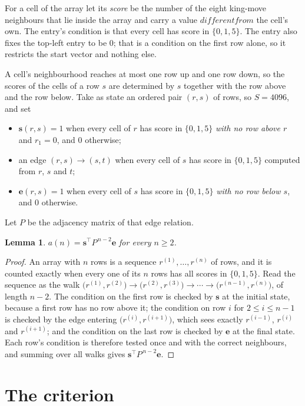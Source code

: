\documentclass[11pt,a4paper]{article}
\theoremstyle{plain}
\newtheorem{lemma}[theorem]{Lemma}
\theoremstyle{definition}
\begin{document}
For a cell of the array let its \emph{score} be the number of the eight king-move neighbours that lie inside
the array and carry a value $different from$ the cell's own. The entry's condition is that every cell
has score in $\{0,1,5\}$. The entry also fixes the top-left entry to be $0$; that is a condition on the first row alone, so it restricts the start vector and nothing else.

A cell's neighbourhood reaches at most one row up and one row down, so the scores of the
cells of a row $s$ are determined by $s$ together with the row above and the row below.
Take as state an ordered pair $(r,s)$ of rows, so $S=4096$, and set
\begin{itemize}
\item $\mathbf{s}(r,s)=1$ when every cell of $r$ has score in $\{0,1,5\}$ \emph{with no row
above $r$} and $r_1=0$, and $0$ otherwise;
\item an edge $(r,s)\to(s,t)$ when every cell of $s$ has score in $\{0,1,5\}$ computed from
$r$, $s$ and $t$;
\item $\mathbf{e}(r,s)=1$ when every cell of $s$ has score in $\{0,1,5\}$ \emph{with no row
below $s$}, and $0$ otherwise.
\end{itemize}
Let $P$ be the adjacency matrix of that edge relation.

\begin{lemma}\label{lem:walk}
$a(n)=\mathbf{s}^{\!\top}P^{\,n-2}\mathbf{e}$ for every $n\ge2$.
\end{lemma}

\begin{proof}
An array with $n$ rows is a sequence $r^{(1)},\dots,r^{(n)}$ of rows, and it is counted
exactly when every one of its $n$ rows has all scores in $\{0,1,5\}$. Read the sequence as the
walk $\bigl(r^{(1)},r^{(2)}\bigr)\to\bigl(r^{(2)},r^{(3)}\bigr)\to\cdots\to
\bigl(r^{(n-1)},r^{(n)}\bigr)$, of length $n-2$. The condition on the first row is
checked by $\mathbf{s}$ at the initial state, because a first row has no row above it; the
condition on row $i$ for $2\le i\le n-1$ is checked by the edge entering
$\bigl(r^{(i)},r^{(i+1)}\bigr)$, which sees exactly $r^{(i-1)}$, $r^{(i)}$ and
$r^{(i+1)}$; and the condition on the last row is checked by $\mathbf{e}$ at the final
state. Each row's condition is therefore tested once and with the correct neighbours, and
summing over all walks gives $\mathbf{s}^{\!\top}P^{\,n-2}\mathbf{e}$.
\end{proof}

\section{The criterion}
\end{document}
